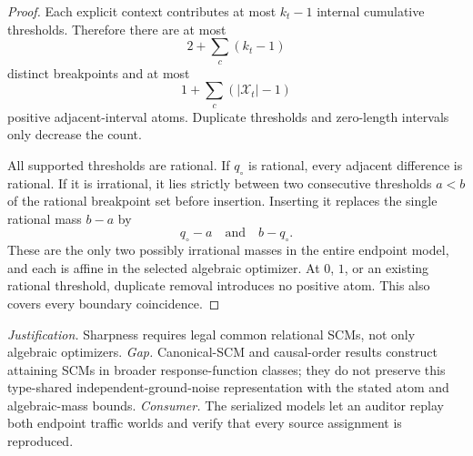\documentclass{article}
\begin{document}
\begin{proof}
Each explicit context contributes at most \(k_t-1\) internal cumulative thresholds.  Therefore there are at most
\[
 2+\sum_c(k_t-1)
\]
distinct breakpoints and at most
\[
 1+\sum_c(|\mathcal X_t|-1)
\]
positive adjacent-interval atoms.  Duplicate thresholds and zero-length intervals only decrease the count.

All supported thresholds are rational.  If \(q_\circ\) is rational, every adjacent difference is rational.  If it is irrational, it lies strictly between two consecutive thresholds \(a<b\) of the rational breakpoint set before insertion.  Inserting it replaces the single rational mass \(b-a\) by
\[
 q_\circ-a
 \quad\text{and}\quad
 b-q_\circ.
\]
These are the only two possibly irrational masses in the entire endpoint model, and each is affine in the selected algebraic optimizer.  At \(0\), \(1\), or an existing rational threshold, duplicate removal introduces no positive atom.  This also covers every boundary coincidence.
\end{proof}
\par\smallskip\noindent \textit{Justification.} Sharpness requires legal common relational SCMs, not only algebraic optimizers. \textit{Gap.} Canonical-SCM and causal-order results construct attaining SCMs in broader response-function classes; they do not preserve this type-shared independent-ground-noise representation with the stated atom and algebraic-mass bounds. \textit{Consumer.} The serialized models let an auditor replay both endpoint traffic worlds and verify that every source assignment is reproduced.
\end{document}
